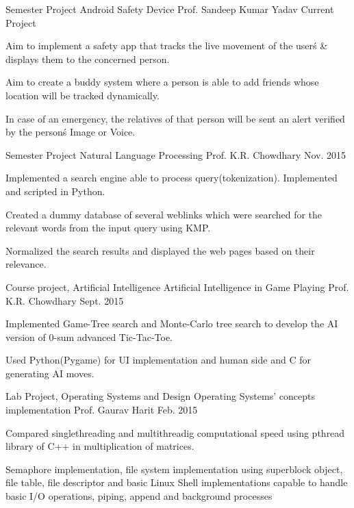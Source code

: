 
\begin{cventries}

 \cventry
    {Semester Project}
    {Android Safety Device}
    {Prof. Sandeep Kumar Yadav}
    {Current Project}
    {
      \begin{cvitems}
    \item {Aim to implement a safety app that tracks the live movement of the user\'s \& displays them to the concerned person. 
    }
    \item {Aim to create a buddy system where a person is able to add friends whose location will be tracked dynamically.
    }
    \item {In case of an emergency, the relatives of that person will be sent an alert verified by the person\'s Image or Voice.}
      \end{cvitems}
    }
    
    \cventry
    {Semester Project}
    {Natural Language Processing}
    {Prof. K.R. Chowdhary}
    {Nov. 2015}
    {
      \begin{cvitems}
    \item {Implemented a search engine able to process query(tokenization). Implemented and scripted in Python.
    }
    \item {Created a dummy database of several weblinks which were searched for the relevant words from the input query using KMP.
    }
    \item {Normalized the search results and displayed the web pages based on their relevance.
    }
      \end{cvitems}
    }
  
  \cventry
    {Course project, Artificial Intelligence}
    {Artificial Intelligence in Game Playing}
    {Prof. K.R. Chowdhary}
    {Sept. 2015}
    {
      \begin{cvitems}
    \item {Implemented Game-Tree search and Monte-Carlo tree search to develop the AI version of 0-sum advanced Tic-Tac-Toe.
    }
    \item {Used Python(Pygame) for UI implementation and human side and C for generating AI moves.
    }
      \end{cvitems}
    }
  
    \cventry
    {Lab Project, Operating Systems and Design}
    {Operating Systems' concepts implementation}
    {Prof. Gaurav Harit}
    {Feb. 2015}
    {
      \begin{cvitems}
    \item {Compared singlethreading and multithreadig computational speed using pthread library of C++ in multiplication of matrices.
    }
    \item {Semaphore implementation, file system implementation using superblock object, file table, file descriptor and basic Linux Shell implementations capable to handle basic I/O operations, piping, append and background processes}
      \end{cvitems}
    }
  

\end{cventries}
